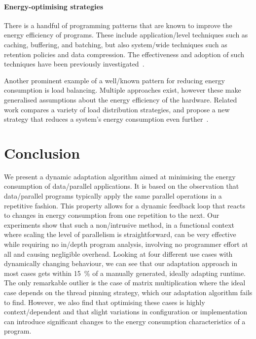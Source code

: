 \paragraph{Energy-optimising strategies}
There is a handful of programming patterns that are known to improve the energy efficiency of programs.
These include application\-/level techniques such as caching, buffering, and batching, but also system\-/wide techniques such as retention policies and data compression.
The effectiveness and adoption of such techniques have been previously investigated~\cite{jin2017survey,funke2024experimental}.

Another prominent example of a well\-/known pattern for reducing energy consumption is load balancing.
Multiple approaches exist, however these make generalised assumptions about the energy efficiency of the hardware.
Related work compares a variety of load distribution strategies, and propose a new strategy that reduces a system's energy consumption even further~\cite{kistowski2015energy}.

\section{Conclusion}
We present a dynamic adaptation algorithm aimed at minimising the energy consumption of data\-/parallel applications.
It is based on the observation that data\-/parallel programs typically apply the same parallel operations in a repetitive fashion.
This property allows for a dynamic feedback loop that reacts to changes in energy consumption from one repetition to the next.
Our experiments show that such a non\-/intrusive method, in a functional context where scaling the level of parallelism is straightforward, can be very effective while requiring no in\-/depth program analysis, involving no programmer effort at all and causing negligible overhead.
Looking at four different use cases with dynamically changing behaviour, we can see that our adaptation approach in most cases gets within \qty{15}{\percent} of a manually generated, ideally adapting runtime.
The only remarkable outlier is the case of matrix multiplication where the ideal case depends on the thread pinning strategy, which our adaptation algorithm fails to find.
However, we also find that optimising these cases is highly context\-/dependent and that slight variations in configuration or implementation can introduce significant changes to the energy consumption characteristics of a program.

